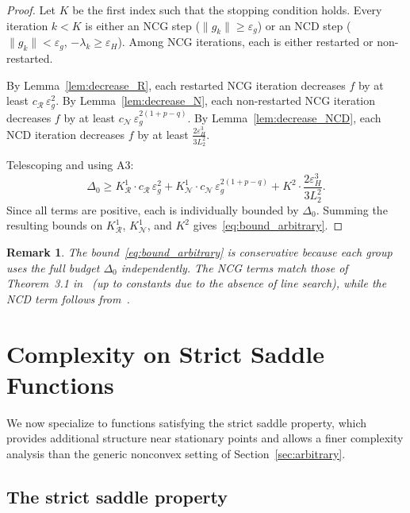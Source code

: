 \documentclass{article}
\newtheorem{remark}{Remark}
\begin{document}
\begin{proof}
Let $K$ be the first index such that the stopping condition holds. Every iteration $k < K$ is either an NCG step ($\|g_k\| \geq \varepsilon_g$) 
or an NCD step ($\|g_k\| < \varepsilon_g$, $-\lambda_k \geq \varepsilon_H$). Among NCG iterations, each is either restarted or non-restarted.

By Lemma~\ref{lem:decrease_R}, each restarted NCG iteration decreases $f$ by at least $c_{\mathcal{R}}\,\varepsilon_g^2$. 
By Lemma~\ref{lem:decrease_N}, each non-restarted NCG iteration decreases $f$ by at least $c_{\mathcal{N}}\,\varepsilon_g^{2(1+p-q)}$. By Lemma~\ref{lem:decrease_NCD}, each NCD iteration decreases $f$ by at least $\frac{2\varepsilon_H^3}{3L_2^2}$.

Telescoping and using A3:
\[
\Delta_0 \geq K^1_{\mathcal{R}} \cdot c_{\mathcal{R}}\,\varepsilon_g^2 + K^1_{\mathcal{N}} \cdot c_{\mathcal{N}}\,\varepsilon_g^{2(1+p-q)} + K^2 \cdot \frac{2\varepsilon_H^3}{3L_2^2}.
\]
Since all terms are positive, each is individually bounded by $\Delta_0$. Summing the resulting bounds on $K^1_{\mathcal{R}}$, $K^1_{\mathcal{N}}$, and $K^2$ gives~\eqref{eq:bound_arbitrary}.
\end{proof}

\begin{remark}
The bound~\eqref{eq:bound_arbitrary} is conservative because each group uses the full budget $\Delta_0$ independently. The NCG terms match those of Theorem~3.1 in~\cite{RoyerChan2022} (up to constants due to the absence of line search), while the NCD term follows from~\cite{WrightMa2022}.
\end{remark}


\section{Complexity on Strict Saddle Functions}
\label{sec:strict_saddle}

We now specialize to functions satisfying the strict saddle property,
which provides additional structure near stationary points and allows a
finer complexity analysis than the generic nonconvex setting of
Section~\ref{sec:arbitrary}.

\subsection{The strict saddle property}
\end{document}
